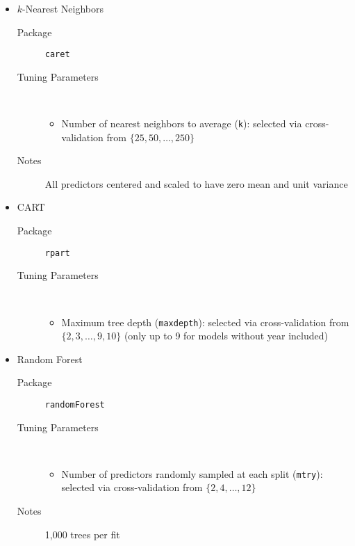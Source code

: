 \begin{itemize}
  \item $k$-Nearest Neighbors 
  \begin{description}
    \item[Package] \texttt{caret} 
    \item[Tuning Parameters] ~
    \begin{itemize}
      \item Number of nearest neighbors to average (\texttt{k}): selected via cross-validation from $\{25, 50, \ldots, 250\}$
    \end{itemize}
    \item[Notes] All predictors centered and scaled to have zero mean and unit variance
  \end{description}

  \item CART 
  \begin{description}
    \item[Package] \texttt{rpart} 
    \item[Tuning Parameters] ~
    \begin{itemize}
      \item Maximum tree depth (\texttt{maxdepth}): selected via cross-validation from $\{2, 3, \ldots, 9, 10\}$ (only up to 9 for models without year included)
    \end{itemize}
  \end{description}

  \item Random Forest 
  \begin{description}
    \item[Package] \texttt{randomForest} 
    \item[Tuning Parameters] ~
    \begin{itemize}
      \item Number of predictors randomly sampled at each split (\texttt{mtry}): selected via cross-validation from $\{2, 4, \ldots, 12\}$
    \end{itemize}
    \item[Notes] 1,000 trees per fit
  \end{description}


\end{itemize}

